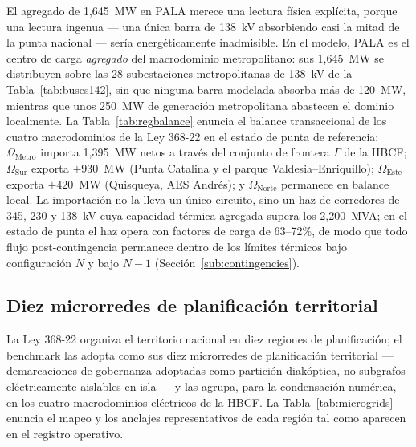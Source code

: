 El agregado de 1,645~MW en PALA merece una lectura física explícita, porque una lectura ingenua --- una única barra de 138~kV absorbiendo casi la mitad de la punta nacional --- sería energéticamente inadmisible. En el modelo, PALA es el centro de carga \emph{agregado} del macrodominio metropolitano: sus 1,645~MW se distribuyen sobre las 28 subestaciones metropolitanas de 138~kV de la Tabla~\ref{tab:buses142}, sin que ninguna barra modelada absorba más de 120~MW, mientras que unos 250~MW de generación metropolitana abastecen el dominio localmente. La Tabla~\ref{tab:regbalance} enuncia el balance transaccional de los cuatro macrodominios de la Ley 368-22 en el estado de punta de referencia: $\Omega_{\mathrm{Metro}}$ importa 1,395~MW netos a través del conjunto de frontera $\Gamma$ de la HBCF; $\Omega_{\mathrm{Sur}}$ exporta $+930$~MW (Punta Catalina y el parque Valdesia--Enriquillo); $\Omega_{\mathrm{Este}}$ exporta $+420$~MW (Quisqueya, AES Andr\'es); y $\Omega_{\mathrm{Norte}}$ permanece en balance local. La importación no la lleva un único circuito, sino un haz de corredores de 345, 230 y 138~kV cuya capacidad térmica agregada supera los 2,200~MVA; en el estado de punta el haz opera con factores de carga de 63--72\%, de modo que todo flujo post-contingencia permanece dentro de los límites térmicos bajo configuración $N$ y bajo $N-1$ (Sección~\ref{sub:contingencies}).

\subsection{Diez microrredes de planificación territorial}
\label{sub:microgrids}

La Ley 368-22 organiza el territorio nacional en diez regiones de planificación; el benchmark las adopta como sus diez microrredes de planificación territorial --- demarcaciones de gobernanza adoptadas como partición diakóptica, no subgrafos eléctricamente aislables en isla --- y las agrupa, para la condensación numérica, en los cuatro macrodominios eléctricos de la HBCF. La Tabla~\ref{tab:microgrids} enuncia el mapeo y los anclajes representativos de cada región tal como aparecen en el registro operativo.

